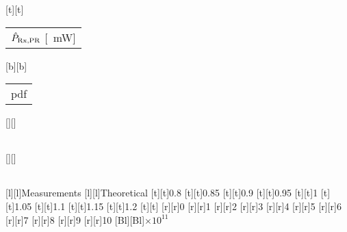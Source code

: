 %    
%
%
%
[t][t]{\fontsize{8}{12}\selectfont \color[rgb]{0.15,0.15,0.15}\setlength{\tabcolsep}{0pt}\begin{tabular}{c}$\hat{P}_{\text{Rx,PR}}$ [\SI{}{mW}]\end{tabular}}%
[b][b]{\fontsize{8}{12}\selectfont \color[rgb]{0,0,0}\setlength{\tabcolsep}{0pt}\begin{tabular}{c}pdf\end{tabular}}%
[][]{\fontsize{10}{15}\selectfont \color[rgb]{0,0,0}\setlength{\tabcolsep}{0pt}\begin{tabular}{c} \end{tabular}}%
[][]{\fontsize{10}{15}\selectfont \color[rgb]{0,0,0}\setlength{\tabcolsep}{0pt}\begin{tabular}{c} \end{tabular}}%
[l][l]{\fontsize{8}{12}\selectfont \color[rgb]{0,0,0}Measurements}%
[l][l]{\fontsize{8}{12}\selectfont \color[rgb]{0,0,0}Theoretical}%
%
\fontsize{8}{12}%
\selectfont%
%
[t][t]{0.8}%
[t][t]{0.85}%
[t][t]{0.9}%
[t][t]{0.95}%
[t][t]{1}%
[t][t]{1.05}%
[t][t]{1.1}%
[t][t]{1.15}%
[t][t]{1.2}%
[t][t]{}%
%
[r][r]{0}%
[r][r]{1}%
[r][r]{2}%
[r][r]{3}%
[r][r]{4}%
[r][r]{5}%
[r][r]{6}%
[r][r]{7}%
[r][r]{8}%
[r][r]{9}%
[r][r]{10}%
[Bl][Bl]{$\times 10^{11}$}%
%
%
